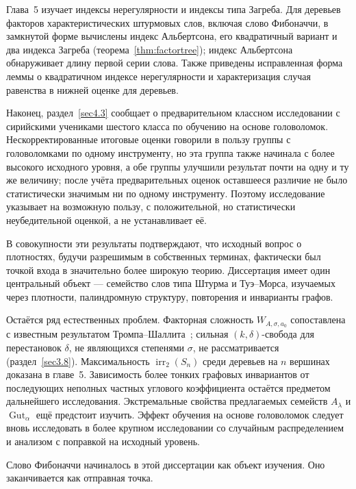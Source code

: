\documentclass[a4paper,14pt]{extreport}
\theoremstyle{plain}
\theoremstyle{definition}
\theoremstyle{remark}
\begin{document}
Глава~5 изучает индексы нерегулярности и индексы типа Загреба. Для деревьев факторов характеристических штурмовых слов, включая слово Фибоначчи, в замкнутой форме вычислены индекс Альбертсона, его квадратичный вариант и два индекса Загреба (теорема~\ref{thm:factortree}); индекс Альбертсона обнаруживает длину первой серии слова. Также приведены исправленная форма леммы о квадратичном индексе нерегулярности и характеризация случая равенства в нижней оценке для деревьев.

Наконец, раздел~\ref{sec4.3} сообщает о предварительном классном исследовании с сирийскими учениками шестого класса по обучению на основе головоломок. Нескорректированные итоговые оценки говорили в пользу группы с головоломками по одному инструменту, но эта группа также начинала с более высокого исходного уровня, а обе группы улучшили результат почти на одну и ту же величину; после учёта предварительных оценок оставшееся различие не было статистически значимым ни по одному инструменту. Поэтому исследование указывает на возможную пользу, с положительной, но статистически неубедительной оценкой, а не устанавливает её.

В совокупности эти результаты подтверждают, что исходный вопрос о плотностях, будучи разрешимым в собственных терминах, фактически был точкой входа в значительно более широкую теорию. Диссертация имеет один центральный объект --- семейство слов типа Штурма и Туэ--Морса, изучаемых через плотности, палиндромную структуру, повторения и инварианты графов.

Остаётся ряд естественных проблем. Факторная сложность $W_{A,\sigma,a_0}$ сопоставлена с известным результатом Тромпа--Шаллита~\cite{TrompShallit1995}; сильная $(k,\delta)$-свобода для перестановок $\delta$, не являющихся степенями $\sigma$, не рассматривается (раздел~\ref{sec3.8}). Максимальность $\operatorname{irr}_2(S_n)$ среди деревьев на $n$ вершинах доказана в главе~5. Зависимость более тонких графовых инвариантов от последующих неполных частных углового коэффициента остаётся предметом дальнейшего исследования.
Экстремальные свойства предлагаемых семейств $A_\lambda$ и $\operatorname{Gut}_\alpha$ ещё предстоит изучить. Эффект обучения на основе головоломок следует вновь исследовать в более крупном исследовании со случайным распределением и анализом с поправкой на исходный уровень.

Слово Фибоначчи начиналось в этой диссертации как объект изучения. Оно заканчивается как отправная точка.    
\end{document}
